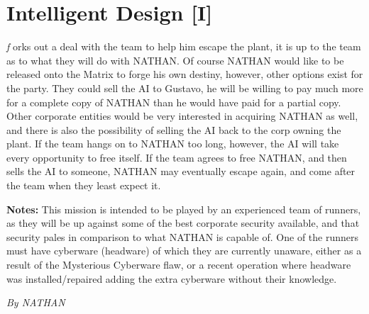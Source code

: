 \documentclass[letterpaper,twocolumn,10.5pt]{article}
\newenvironment{scenario}[6]
	{
		\section{#1 {\small[#2]}}
		\textit{#3}
		\def\TMPSCENARIO{#4 #5}
	}
	{\small\textit{By \TMPSCENARIO}}
\newcommand{\notes}{\textbf{Notes: }}
\begin{document}
\begin{scenario}{Intelligent Design}
If \textsc{NATHAN} works out a deal with the team to help him escape the plant, it is up to the team as to what they will do with \textsc{NATHAN}. Of course \textsc{NATHAN} would like to be released onto the Matrix to forge his own destiny, however, other options exist for the party. They could sell the AI to Gustavo, he will be willing to pay much more for a complete copy of \textsc{NATHAN} than he would have paid for a partial copy. Other corporate entities would be very interested in acquiring \textsc{NATHAN} as well, and there is also the possibility of selling the AI back to the corp owning the plant. If the team hangs on to \textsc{NATHAN} too long, however, the AI will take every opportunity to free itself. If the team agrees to free \textsc{NATHAN}, and then sells the AI to someone, \textsc{NATHAN} may eventually escape again, and come after the team when they least expect it.

\notes This mission is intended to be played by an experienced team of runners, as they will be up against some of the best corporate security available, and that security pales in comparison to what \textsc{NATHAN} is capable of. One of the runners must have cyberware (headware) of which they are currently unaware, either as a result of the Mysterious Cyberware flaw, or a recent operation where headware was installed/repaired adding the extra cyberware without their knowledge.

\end{scenario}
\end{document}
